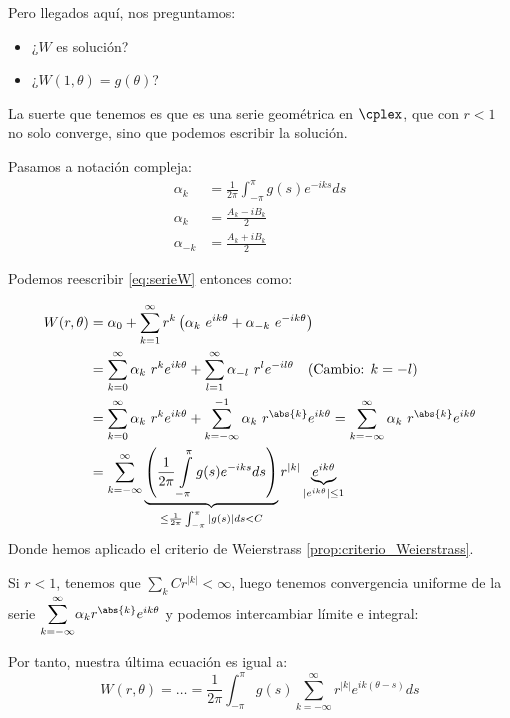 		Pero llegados aquí, nos preguntamos:

		\begin{itemize}
			\item ¿$W$ es solución?
			\item ¿$W(1, \theta) = g(\theta)$?
		\end{itemize}

		La suerte que tenemos es que es una serie geométrica en $\cplex$, que con $r<1$ no solo converge, sino que podemos escribir la solución.

		Pasamos a notación compleja:
		\begin{align*}
			\alpha_k &= \frac{1}{2\pi} \int_{-\pi}^{\pi} g(s) e^{-iks} ds \\
			\alpha_k &= \frac{A_k - iB_k}{2} \\
			\alpha_{-k} &= \frac{A_k + iB_k}{2}
		\end{align*}

		Podemos reescribir \eqref{eq:serieW} entonces como:

		\begin{align*}
		W(r, \theta) &= \alpha_0 + \sum_{k=1}^{\infty} r^k \left( \alpha_k\  e^{ik\theta} + \alpha_{-k}\  e^{-ik\theta} \right)\\
%
		&= \sum_{k=0}^{\infty} \alpha_k\  r^k e^{ik\theta} + \sum_{l=1}^{\infty} \alpha_{-l}\ r^l e^{-il\theta} \quad (\text{Cambio: } k = -l)\\
%
		&= \sum_{k=0}^{\infty} \alpha_k\  r^k e^{ik\theta} + \sum_{k=-\infty}^{-1} \alpha_{k}\  r^{\abs{k}} e^{ik\theta} = \sum_{k=-\infty}^{\infty} \alpha_{k}\  r^{\abs{k}} e^{ik\theta}\\
%
		&= \sum_{k=-\infty}^{\infty} \underbrace{\left( \frac{1}{2\pi} \int\limits_{-\pi}^{\pi} g(s) e^{-iks} ds \right)}_{\leq \frac{1}{2\pi} \int_{-\pi}^{\pi} |g(s)| ds < C} r ^{|k|} \underbrace{e^{ik\theta}}_{|e^{ik\theta}| \leq 1}\\
		\end{align*}
		Donde hemos aplicado el criterio de Weierstrass \ref{prop:criterio_Weierstrass}.

		Si $r < 1$, tenemos que $\sum\limits_k Cr^{|k|} < \infty$, luego tenemos convergencia uniforme de la serie $\mathlarger{\sum}\limits_{k=-\infty}^{\infty} \alpha_{k} r^{\abs{k}} e^{ik\theta}$ y podemos intercambiar límite e integral:

		Por tanto, nuestra última ecuación es igual a:
		\[ W(r,\theta) = \dots = \frac{1}{2\pi} \int_{-\pi}^{\pi} g(s) \sum_{k=-\infty}^{\infty} r^{|k|} e^{ik(\theta-s)} ds \]

